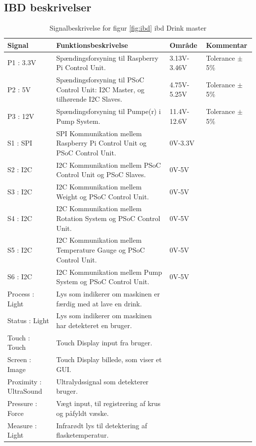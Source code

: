 \subsection{IBD beskrivelser}

\begin{table}[H] 
	\centering 
	\begin{tabular}{|p{2cm}|p{6cm}|p{2cm}|p{3cm}|}
		\hline
\textbf{Signal} & \textbf{Funktionsbeskrivelse}  & \textbf{Område} &  \textbf{Kommentar}  \\ \hline
P1 : 3.3V & Spændingsforsyning til Raspberry Pi Control Unit. & 3.13V-3.46V & Tolerance $\pm$ 5\%  \\ \hline
P2 : 5V & Spændingsforsyning til PSoC Control Unit: I2C Master, og tilhørende I2C Slaves. & 4.75V-5.25V & Tolerance $\pm$ 5\%  \\ \hline
P3 : 12V & Spændingsforsyning til Pumpe(r) i Pump System. & 11.4V-12.6V & Tolerance $\pm$ 5\% \\ \hline
S1 : SPI & SPI Kommunikation mellem Raspberry Pi Control Unit og PSoC Control Unit. & 0V-3.3V &  \\ \hline
S2 : I2C & I2C Kommunikation mellem PSoC Control Unit og PSoC Slaves. & 0V-5V &  \\ \hline 
S3 : I2C & I2C Kommunikation mellem Weight og PSoC Control Unit. & 0V-5V &  \\ \hline
S4 : I2C & I2C Kommunikation mellem Rotation System og PSoC Control Unit. & 0V-5V &  \\ \hline
S5 : I2C & I2C Kommunikation mellem Temperature Gauge og PSoC Control Unit. & 0V-5V &  \\ \hline
S6 : I2C & I2C Kommunikation mellem Pump System og PSoC Control Unit. & 0V-5V &  \\ \hline
Process : Light & Lys som indikerer om maskinen er færdig med at lave en drink. & \cellcolor{gray} &  \\ \hline
Status : Light & Lys som indikerer om maskinen har detekteret en bruger. & \cellcolor{gray} &  \\ \hline
Touch : Touch & Touch Display input fra bruger. & \cellcolor{gray} &  \\ \hline
Screen : Image & Touch Display billede, som viser et GUI. & \cellcolor{gray} &  \\ \hline
Proximity : UltraSound & Ultralydssignal som detekterer bruger. & \cellcolor{gray} &  \\ \hline
Pressure : Force & Vægt input, til registrering af krus og påfyldt væske. & \cellcolor{gray} &  \\ \hline
Measure : Light & Infrarødt lys til detektering af flasketemperatur. & \cellcolor{gray} &  \\ \hline
	\end{tabular}
	\caption{Signalbeskrivelse for figur \ref{fig:ibd} ibd Drink master}
	\label{tab:signalbeskrivelse}
\end{table}
\FloatBarrier

